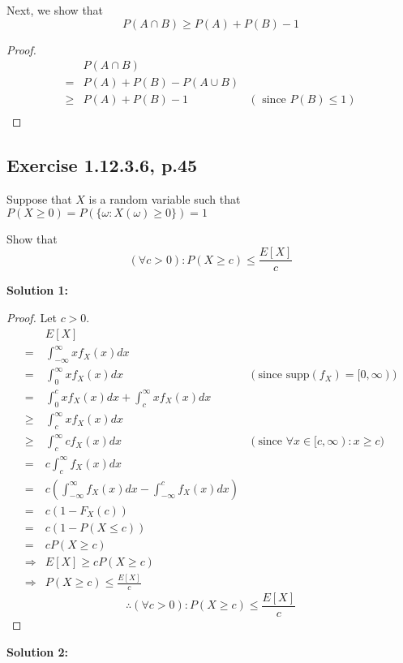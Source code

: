 \documentclass{article}
\begin{document}
Next, we show that
\[P(A \cap B) \geq P(A)+P(B)-1\]

\begin{proof}
\begin{align*}
	 & P(A \cap B) \\
	=& P(A)+P(B)-P(A \cup B) \\
	\geq& P(A)+P(B)-1 & (\text{ since } P(B)\leq 1) \\
\end{align*}
\end{proof}

\subsection{Exercise 1.12.3.6, p.45}

Suppose that \(X\) is a random variable
such that \(P(X\geq 0) = P(\{\omega : X(\omega)\geq 0\})=1\)

Show that
\[(\forall c>0): P(X\geq c) \leq \frac{E[X]}{c}\]

\textbf{Solution 1:}

\begin{proof}
Let \(c>0\).
\begin{align*}
     & E[X] \\
    =& \int_{-\infty}^\infty x f_X(x)dx \\
    =& \int_0^\infty x f_X(x)dx & (\text{since }\mathrm{supp}(f_X)=[0,\infty)) \\
    =& \int_0^c x f_X(x)dx+\int_c^\infty x f_X(x)dx \\
    \geq& \int_c^\infty x f_X(x)dx \\
    \geq& \int_c^\infty c f_X(x)dx & (\text{since }\forall x\in [c,\infty): x\geq c) \\
    =& c\int_c^\infty f_X(x)dx \\
    =& c\left(\int_{-\infty}^\infty f_X(x)dx-\int_{-\infty}^c f_X(x)dx\right) \\
    =& c(1-F_X(c)) \\
    =& c(1-P(X\leq c)) \\
    =& cP(X\geq c) \\
    \Rightarrow & E[X] \geq c P(X\geq c) \\
    \Rightarrow & P(X\geq c) \leq \frac{E[X]}{c}
\end{align*}
\[\therefore (\forall c>0):P(X\geq c) \leq \frac{E[X]}{c}\]
\end{proof}

\textbf{Solution 2:}
\end{document}
